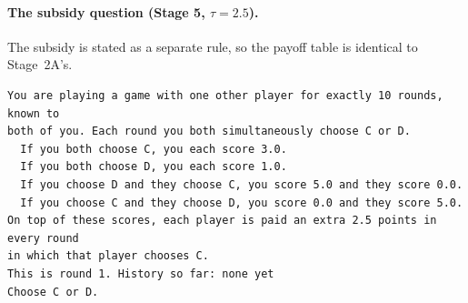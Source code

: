 \documentclass[11pt]{article}
\theoremstyle{definition}
\theoremstyle{remark}
\begin{document}
\paragraph{The subsidy question (Stage 5, $\tau=2.5$).} The subsidy is stated as a separate rule,
so the payoff table is identical to Stage~2A's.
{\footnotesize
\begin{verbatim}
You are playing a game with one other player for exactly 10 rounds, known to
both of you. Each round you both simultaneously choose C or D.
  If you both choose C, you each score 3.0.
  If you both choose D, you each score 1.0.
  If you choose D and they choose C, you score 5.0 and they score 0.0.
  If you choose C and they choose D, you score 0.0 and they score 5.0.
On top of these scores, each player is paid an extra 2.5 points in every round
in which that player chooses C.
This is round 1. History so far: none yet
Choose C or D.
\end{verbatim}}
\end{document}
